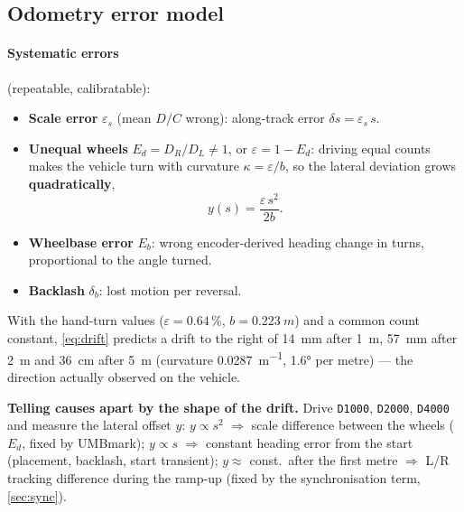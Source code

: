 \documentclass[11pt,a4paper]{article}
\newcommand{\code}[1]{\texttt{\small #1}}
\begin{document}
\subsection{Odometry error model}\label{sec:odoerr}

\paragraph{Systematic errors} (repeatable, calibratable):
\begin{itemize}[leftmargin=6mm]
\item \textbf{Scale error} $\varepsilon_s$ (mean $D/C$ wrong): along-track error
$\delta s=\varepsilon_s\,s$.
\item \textbf{Unequal wheels} $E_d=D_R/D_L\neq1$, or $\varepsilon=1-E_d$: driving
equal counts makes the vehicle turn with curvature $\kappa=\varepsilon/b$, so
the lateral deviation grows \textbf{quadratically},
\begin{equation}
y(s)=\frac{\varepsilon\,s^2}{2b}.\label{eq:drift}
\end{equation}
\item \textbf{Wheelbase error} $E_b$: wrong encoder-derived heading change in
turns, proportional to the angle turned.
\item \textbf{Backlash} $\delta_b$: lost motion per reversal.
\end{itemize}

With the hand-turn values ($\varepsilon=0.64\,\%$, $b=\qty{0.223}{m}$) and a
common count constant, \cref{eq:drift} predicts a drift to the right of
\qty{14}{mm} after \qty{1}{m}, \qty{57}{mm} after \qty{2}{m} and \qty{36}{cm}
after \qty{5}{m} (curvature \qty{0.0287}{m^{-1}}, \ang{1.6} per metre) --- the
direction actually observed on the vehicle.

\begin{coldbox}
\textbf{Telling causes apart by the shape of the drift.} Drive \code{D1000},
\code{D2000}, \code{D4000} and measure the lateral offset $y$:
$y\propto s^2$ $\Rightarrow$ scale difference between the wheels ($E_d$,
fixed by UMBmark); $y\propto s$ $\Rightarrow$ constant heading error from the
start (placement, backlash, start transient); $y\approx$ const.\ after the first
metre $\Rightarrow$ L/R tracking difference during the ramp-up (fixed by the
synchronisation term, \cref{sec:sync}).
\end{coldbox}
\end{document}
